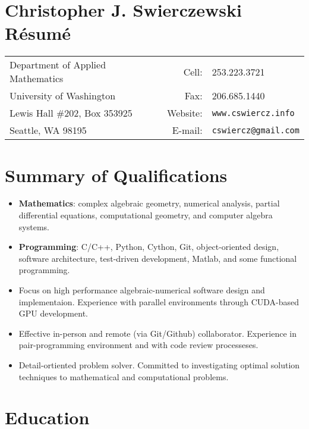 \documentclass{article}
\begin{document}
\section*{Christopher J. Swierczewski \hspace{5.9cm} R\'esum\'e}

\begin{tabular}{lrl}
  Department of Applied Mathematics \hspace{5cm} & Cell:    & 253.223.3721 \\
  University of Washington          & Fax:         & 206.685.1440            \\
  Lewis Hall \#202, Box 353925      & Website:     & \tt www.cswiercz.info   \\
  Seattle, WA 98195                 & E-mail:      & \tt cswiercz@gmail.com
\end{tabular}

\section*{Summary of Qualifications}

\begin{itemize}
  \setlength{\itemsep}{0pt}
  \item {\bf Mathematics}: complex algebraic geometry, numerical
    analysis, partial differential equations, computational geometry,
    and computer algebra systems.
  \item {\bf Programming}: C/C++, Python, Cython, Git, object-oriented
    design, software architecture, test-driven development, Matlab, and
    some functional programming.
  \item Focus on high performance algebraic-numerical software design
    and implementaion. Experience with parallel environments through
    CUDA-based GPU development.
  \item Effective in-person and remote (via Git/Github)
    collaborator. Experience in pair-programming environment and with
    code review processeses.
  \item Detail-ortiented problem solver. Committed to investigating
    optimal solution techniques to mathematical and computational
    problems.
\end{itemize}


\section*{Education}
\end{document}
